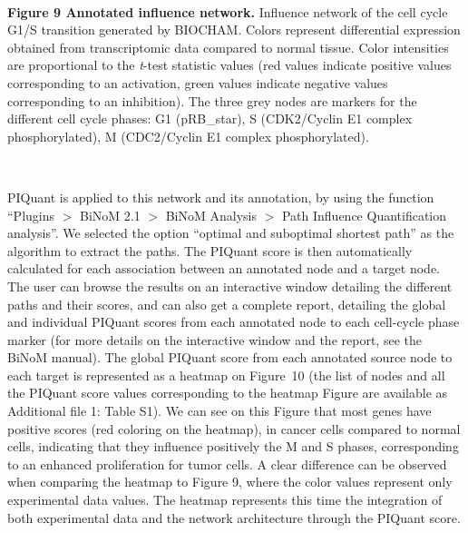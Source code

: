 \documentclass[11pt]{bmc_article_s50}
\newenvironment{bmcformat}{\begin{raggedright}\baselineskip20pt\sloppy\setboolean{publ}{false}}{\end{raggedright}\baselineskip20pt\sloppy}
\begin{document}
\begin{bmcformat}
\hrulefill\

\vspace*{-15pt}
\textbf{Figure 9 Annotated influence network.}
Influence network of the cell cycle G1/S transition generated by BIOCHAM. Colors represent differential
expression obtained from transcriptomic data compared to normal tissue. Color
intensities are proportional to the \textit{t}-test statistic values (red values indicate
positive values corresponding to an activation, green values indicate negative
values corresponding to an inhibition). The three grey nodes are markers for the
different cell cycle phases: G1 (pRB\_star), S (CDK2/Cyclin E1 complex phosphorylated), M (CDC2/Cyclin E1 complex phosphorylated).

\vspace*{-21pt}

\hrulefill\


PIQuant is applied to this network and its annotation, by using the function
``Plugins $>$ BiNoM 2.1 $>$ BiNoM Analysis $>$ Path Influence Quantification
analysis''. We selected the option ``optimal and
suboptimal shortest path'' as the algorithm to extract the paths. The PIQuant
score is then automatically calculated for each association
between an annotated node and a target node. The user can browse the results on an
interactive window detailing the different paths and their scores, and can also
get a complete report, detailing the global and individual PIQuant scores from
each annotated node to each cell-cycle phase marker (for more details on
the interactive window and the report, see the BiNoM manual).
The global PIQuant score from each annotated source node to each target is
represented as a heatmap on Figure~10 (the list of nodes and all the PIQuant
score values corresponding to the heatmap Figure are available as Additional file 1: Table S1). We can see on this Figure that most
genes have positive scores (red coloring on the heatmap), in cancer cells compared to normal cells, indicating that they influence positively the M and
S phases, corresponding to an enhanced proliferation for tumor cells.
A clear difference can be observed when comparing the heatmap to Figure 9, where
the color values represent only experimental data values. The heatmap represents
this time the integration of both experimental data and the network
architecture through the PIQuant score.


\end{bmcformat}
\end{document}
